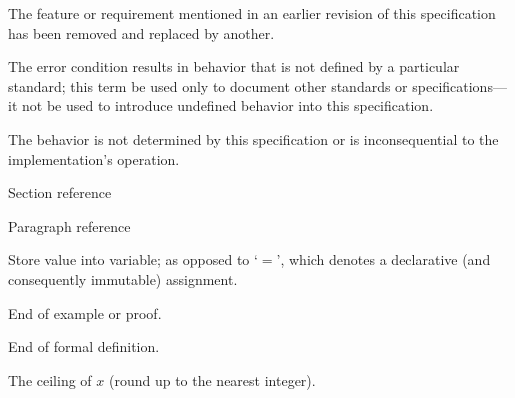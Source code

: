 \begin{description}
  The feature or requirement mentioned in an earlier revision of this
  specification has been removed and replaced by another.

  The error condition results in behavior that is not defined by a particular
  standard; this term \shall be used only to document other standards or
  specifications---it \shall not be used to introduce undefined behavior into
  this specification.

  The behavior is not determined by this specification or is inconsequential to
  the implementation's operation.

  \dt{\S}
  Section reference

  \dt{\P}
  Paragraph reference

  \dt{$\leftarrow$}
  Store value into variable; as opposed to `$=$', which denotes a declarative
  (and consequently immutable) assignment.

  \dt{$\square$}
  End of example or proof.

  \dt{$\blacksquare$}
  End of formal definition.

  The ceiling of $x$ (round up to the nearest integer).
\end{description}

\enddeptgroup
